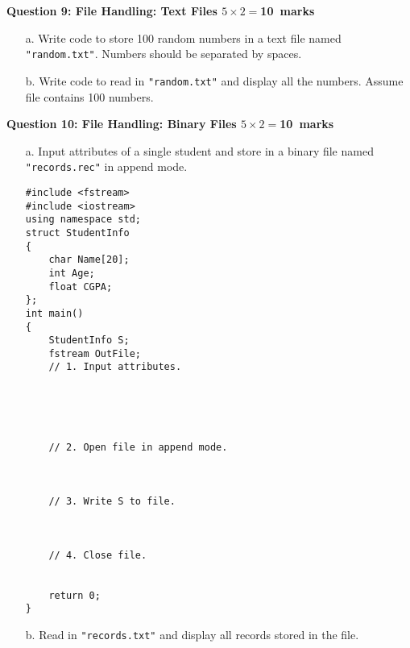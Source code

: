\documentclass[12pt,a4paper]{article}
\def\Qnine{10}
\def\Qten{10}
\begin{document}
\newpage
\noindent\textbf{Question 9: File Handling: Text Files \hfill $5\times 2=$\Qnine~marks}\\
\begin{enumerate}
\item[a.] Write code to store 100 random numbers in a text file named \verb|"random.txt"|. Numbers should be separated by spaces.
\begin{figure}[H]
\end{figure}
\item[b.] Write code to read in \verb|"random.txt"| and display all the numbers. Assume file contains 100 numbers.
\begin{figure}[H]
\end{figure}
\end{enumerate}
\noindent\textbf{Question 10: File Handling: Binary Files \hfill $5\times 2=$\Qten~marks}\\
\begin{enumerate}
\item[a.] Input attributes of a single student and store in a binary file named \verb|"records.rec"| in append mode.
\begin{lstlisting}
#include <fstream>
#include <iostream>
using namespace std;
struct StudentInfo
{
	char Name[20];
	int Age;
	float CGPA;
};
int main()
{
	StudentInfo S;
	fstream OutFile;
	// 1. Input attributes.
	
	
	
	
	
	// 2. Open file in append mode.
	
	
	
	// 3. Write S to file.
	
	
	
	// 4. Close file.
	
		
	return 0;
}
\end{lstlisting}
\item[b.] Read in \verb|"records.txt"| and display all records stored in the file.
\begin{figure}[H]
\end{figure}
\end{enumerate}
\end{document}
